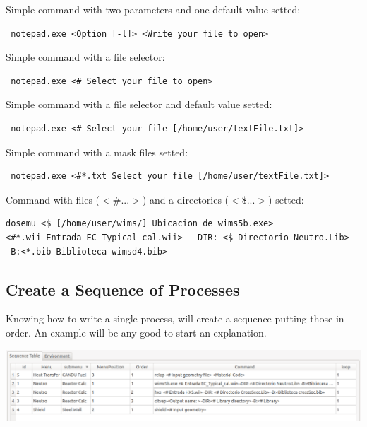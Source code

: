 \documentclass[a4paper,10pt]{article}
\begin{document}
\noindent Simple command with two parameters and one default value setted:

\begin{verbatim} notepad.exe <Option [-l]> <Write your file to open>\end{verbatim}

\noindent Simple command with a file selector:

\begin{verbatim} notepad.exe <# Select your file to open>\end{verbatim}

\noindent Simple command with a file selector and default value setted:

\begin{verbatim} notepad.exe <# Select your file [/home/user/textFile.txt]>\end{verbatim}

\noindent Simple command with a mask files setted:

\begin{verbatim} notepad.exe <#*.txt Select your file [/home/user/textFile.txt]>\end{verbatim}

\noindent Command with files ($<\# ...>$) and a directories ($<\$ ...>$) setted:

\begin{verbatim}
dosemu <$ [/home/user/wims/] Ubicacion de wims5b.exe> 
<#*.wii Entrada EC_Typical_cal.wii>  -DIR: <$ Directorio Neutro.Lib> 
-B:<*.bib Biblioteca wimsd4.bib>
\end{verbatim}


\subsection{Create a Sequence of Processes}

Knowing how to write a single process, will create a sequence putting those in order. An example will be any good to start an explanation. 

\begin{center}
 \includegraphics[width=\textwidth]{img/orderingSequence.png}
\end{center}
\end{document}
